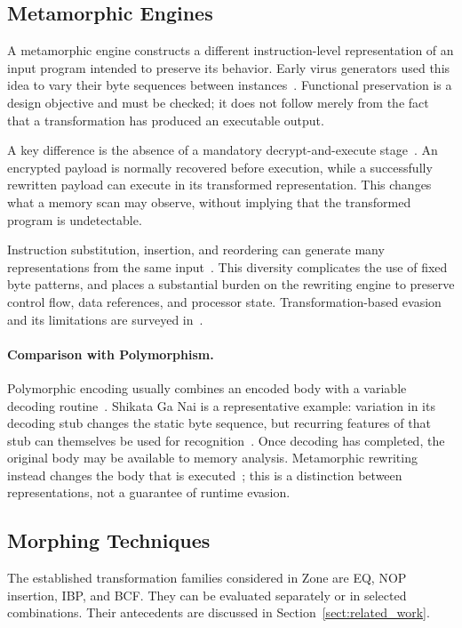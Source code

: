 \documentclass[runningheads]{llncs}
\begin{document}
\subsection{Metamorphic Engines}\label{sub:meth}
A metamorphic engine constructs a different instruction-level representation of an input program intended to preserve its behavior. Early virus generators used this idea to vary their byte sequences between instances~\cite{historycodeobf}. Functional preservation is a design objective and must be checked; it does not follow merely from the fact that a transformation has produced an executable output.

A key difference is the absence of a mandatory decrypt-and-execute stage~\cite{identifyingmeth}. An encrypted payload is normally recovered before execution, while a successfully rewritten payload can execute in its transformed representation. This changes what a memory scan may observe, without implying that the transformed program is undetectable.

Instruction substitution, insertion, and reordering can generate many representations from the same input~\cite{identifyingmeth,metworm}. This diversity complicates the use of fixed byte patterns, and places a substantial burden on the rewriting engine to preserve control flow, data references, and processor state. Transformation-based evasion and its limitations are surveyed in~\cite{PEsurveybible}.

\paragraph{Comparison with Polymorphism.}
Polymorphic encoding usually combines an encoded body with a variable decoding routine~\cite{historycodeobf}. Shikata Ga Nai is a representative example: variation in its decoding stub changes the static byte sequence, but recurring features of that stub can themselves be used for recognition~\cite{sgnstrong}. Once decoding has completed, the original body may be available to memory analysis. Metamorphic rewriting instead changes the body that is executed~\cite{codeExtraction}; this is a distinction between representations, not a guarantee of runtime evasion.

\subsection{Morphing Techniques}
The established transformation families considered in Zone are EQ, NOP insertion, IBP, and BCF. They can be evaluated separately or in selected combinations. Their antecedents are discussed in Section~\ref{sect:related_work}.
\end{document}

